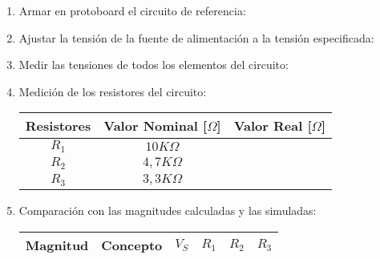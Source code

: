 \begin{enumerate} 
    \item Armar en protoboard el circuito de referencia:
    \item Ajustar la tensión de la fuente de alimentación a la tensión especificada:
    \item Medir las tensiones de todos los elementos del circuito:
    \item Medición de los resistores del circuito:
        \begin{center} 
            \begin{tabular}{| p{1cm}  p{1cm}  p{1cm} |} 
                \hline 
                \multicolumn{1}{|m{1.4cm}}{\centering\textbf{Resistores}} &
                \multicolumn{1}{m{1.4cm}}{\centering\textbf{Valor Nominal [$\Omega$]}} &
                \multicolumn{1}{m{1.4cm}|}{\centering\textbf{Valor Real [$\Omega$]}} \\
                \hline
                \multicolumn{1}{|c}{$R_1$} &
                \multicolumn{1}{c}{$10K\Omega$} &
                \multicolumn{1}{c|}{} \\
                \multicolumn{1}{|c}{$R_2$} &
                \multicolumn{1}{c}{$4,7K\Omega$} &
                \multicolumn{1}{c|}{} \\
                \multicolumn{1}{|c}{$R_3$} &
                \multicolumn{1}{c}{$3,3K\Omega$} &
                \multicolumn{1}{c|}{} \\
                \hline
            \end{tabular}
        \end{center}
    \item Comparación con las magnitudes calculadas y las simuladas: \\[10pt]
        \begin{minipage}{\textwidth}
            \hspace{-1cm}
            \small
            \begin{tabular}{| p{1cm} p{1cm} p{1cm} p{1cm} p{1cm} p{1cm} |}
                \hline
                \multicolumn{1}{|m{1.4cm}}{\centering\textbf{Magnitud}} &
                \multicolumn{1}{m{1.4cm}}{\centering\textbf{Concepto}} &
                \multicolumn{1}{m{.75cm}}{\centering\textbf{$V_S$}} &
                \multicolumn{1}{m{.75cm}}{\centering\textbf{$R_1$}} &
                \multicolumn{1}{m{.75cm}}{\centering\textbf{$R_2$}} &
                \multicolumn{1}{m{.75cm}|}{\centering\textbf{$R_3$}} \\
                \hline

\end{tabular}
\end{minipage}
\end{enumerate}
